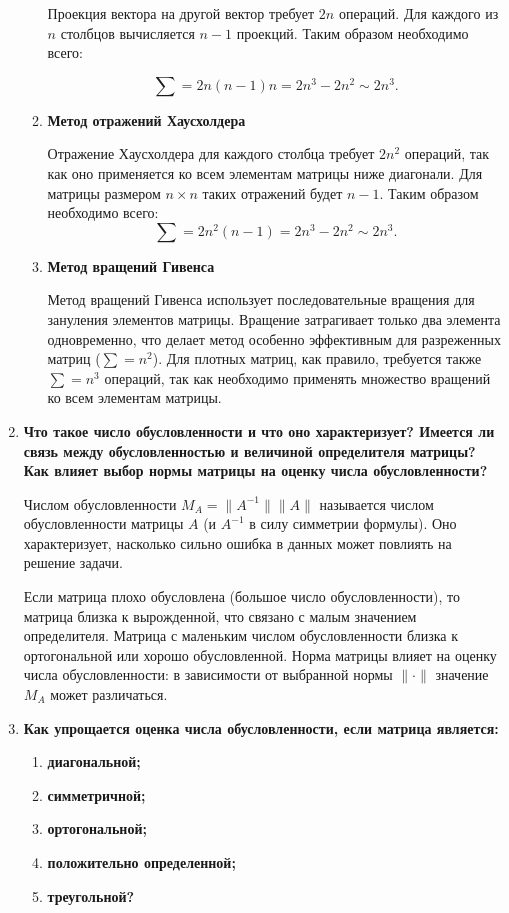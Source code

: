 \documentclass[12pt, a4paper]{article}
\begin{document}
\begin{enumerate}
\begin{enumerate}
			Проекция вектора на другой вектор требует $2n$ операций. Для каждого из $n$ столбцов вычисляется $n-1$ проекций. Таким образом необходимо всего: 
			
			$$\sum = 2n (n-1) n = 2n^3 - 2n^2 \sim 2n^3.$$
			
			\item \textbf{ Метод отражений Хаусхолдера}
			
			Отражение Хаусхолдера для каждого столбца требует $2n^2$ операций, так как оно применяется ко всем элементам матрицы ниже диагонали. Для матрицы размером $n \times n$ таких отражений будет $n-1$. Таким образом необходимо всего: 
			$$\sum = 2n^2 (n-1) = 2n^3 - 2n^2 \sim 2n^3.$$
			\item \textbf{ Метод вращений Гивенса}
			
			Метод вращений Гивенса использует последовательные вращения для зануления элементов матрицы. Вращение затрагивает только два элемента одновременно, что делает метод особенно эффективным для разреженных матриц ($\sum = n^2$). Для плотных матриц, как правило, требуется также $\sum = n^3$ операций, так как необходимо применять множество вращений ко всем элементам матрицы.
		\end{enumerate}
		
		
		
		\item \textbf{Что такое число обусловленности и что оно характеризует?
			Имеется ли связь между обусловленностью и величиной
			определителя матрицы? Как влияет выбор нормы матрицы
			на оценку числа обусловленности?}
		
		Числом обусловленности $M_{A}=\|A^{-1}\| \|A\|$ называется числом обусловленности матрицы $A$ (и $A^{-1}$ в силу симметрии формулы). Оно характеризует, насколько сильно ошибка в данных может повлиять на решение задачи.
		
		Если матрица плохо обусловлена (большое число обусловленности), то матрица близка к вырожденной, что связано с малым значением определителя.
		Матрица с маленьким числом обусловленности близка к ортогональной или хорошо обусловленной.
		Норма матрицы влияет на оценку числа обусловленности: в зависимости от выбранной нормы $\|\cdot\|$ значение $M_{A}$ может различаться.
		
		\item  \textbf{Как упрощается оценка числа обусловленности, если матрица является:}
		\begin{enumerate}
			\item \textbf{ диагональной;}
			\item \textbf{ симметричной;}
			\item \textbf{ ортогональной;}
			\item \textbf{  положительно определенной;}
			\item \textbf{ треугольной?}
		\end{enumerate}
		

\end{enumerate}
\end{document}

